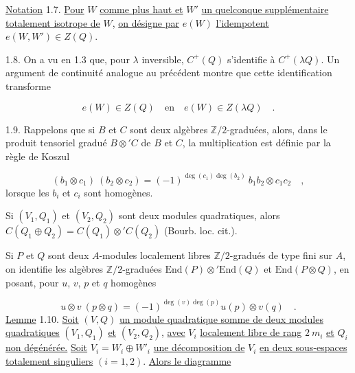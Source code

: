 \underline{Notation} 1.7. \underline{Pour} $W$ \underline{comme plus haut et} $W'$ \underline{un quelconque supplémentaire totalement isotrope de} $W$, \underline{on désigne par} $e(W)$ \underline{l'idempotent} $e(W,W') \in Z(Q)$.

1.8. On a vu en 1.3 que, pour $\lambda$ inversible, $C^+(Q)$ s'identifie à $C^+(\lambda Q)$. Un argument de continuité analogue au précédent montre que cette identification transforme

\begin{equation*}
e(W) \in Z(Q) \quad \mbox{en} \quad e(W) \in Z(\lambda Q) \quad .
\end{equation*}


1.9. Rappelons que si $B$ et $C$ sont deux algèbres $\mathbb{Z}/2$-graduées, alors, dans le produit tensoriel gradué $B \otimes' C$ de $B$ et $C$, la multiplication est définie par la règle de Koszul

\begin{equation*}
(b_1 \otimes c_1)\ (b_2 \otimes c_2) = (-1)^{\deg(c_1)\deg(b_2)}\ b_1 b_2 \otimes c_1 c_2 \quad ,
\end{equation*}
lorsque les $b_i$ et $c_i$ sont homogènes.

Si $(V_1, Q_1)$ et $(V_2, Q_2)$ sont deux modules quadratiques, alors $C(Q_1 \oplus Q_2) = C(Q_1) \otimes' C(Q_2)$ (Bourb. loc. cit.).

Si $P$ et $Q$ sont deux $A$-modules localement libres $\mathbb{Z}/2$-gradués de type fini sur $A$, on identifie les algèbres $\mathbb{Z}/2$-graduées $\mathrm{End}(P) \otimes' \mathrm{End}(Q)$ et $\mathrm{End}(P \otimes Q)$, en posant, pour $u$, $v$, $p$ et $q$ homogènes

\begin{equation*}
u \otimes v\ (p \otimes q) = (-1)^{\deg(v)\deg(p)} u(p) \otimes v(q) \quad .
\end{equation*}
\underline{Lemme} 1.10. \underline{Soit} $(V,Q)$ \underline{un module quadratique somme de deux modules quadratiques} $(V_1, Q_1)$ \underline{et} $(V_2, Q_2)$, \underline{avec} $V_i$ \underline{localement libre de rang} $2\ m_i$ \underline{et} $Q_i$ \underline{non dégénérée.} \underline{Soit} $V_i = W_i \oplus W'_i$ \underline{une décomposition de} $V_i$ \underline{en deux sous-espaces totalement singuliers} $(i = 1, 2)$. \underline{Alors le diagramme}


